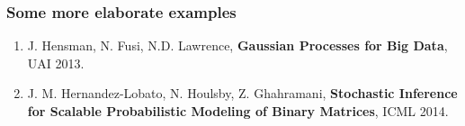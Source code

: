\documentclass{beamer}
\newcommand{\vx}{\mathbf{x}}
\begin{document}
\begin{frame}
  \frametitle{Some more elaborate examples}

  \begin{enumerate}
  \item J. Hensman, N. Fusi, N.D. Lawrence, \textbf{Gaussian Processes for Big Data}, UAI 2013.
  \item J. M. Hernandez-Lobato, N. Houlsby, Z. Ghahramani, \textbf{Stochastic Inference for Scalable Probabilistic Modeling of Binary Matrices}, ICML 2014.
  \end{enumerate}


\end{frame}



\end{document}
